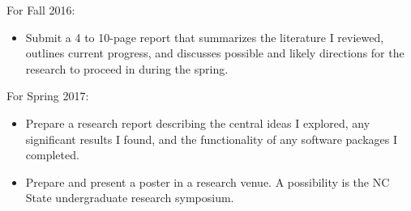 \documentclass[a4paper,10pt]{article}
\begin{document}
	\noindent
	For Fall 2016:
	\begin{itemize}
		\item Submit a 4 to 10-page report that summarizes the literature I reviewed, outlines current progress, and discusses possible and likely directions for the research to proceed in during the spring.
	\end{itemize}
	
	\noindent
	For Spring 2017:
	\begin{itemize}
		\item Prepare a research report describing the central ideas I explored, any significant results I found, and the functionality of any software packages I completed.
		\item Prepare and present a poster in a research venue.  A possibility is the NC State undergraduate research symposium.
	\end{itemize}
	
\end{document}
